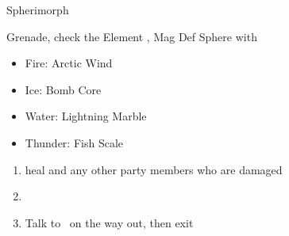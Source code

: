 \begin{battle}[12000]{Spherimorph}
	\begin{itemize}
		\switch{\tidus}{\rikku}
		\rikkuf Grenade, check the Element
		\rikkuf \od, Mag Def Sphere with
		\begin{itemize}
			\item Fire: Arctic Wind
			\item Ice: Bomb Core
			\item Water: Lightning Marble
			\item Thunder: Fish Scale
		\end{itemize}
	\end{itemize}
\end{battle}
\begin{enumerate}[resume]
	\item heal \rikku and any other party members who are damaged
	\item \formation{\tidus}{\kimahri}{\auron}
	\item Talk to \auron\ on the way out, then exit
\end{enumerate}
